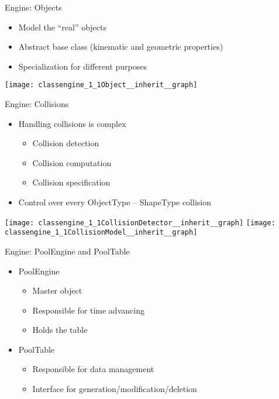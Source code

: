 \documentclass{beamer}
\begin{document}
\begin{frame}{Engine: Objects}
	\begin{itemize}
		\item Model the ``real'' objects
		\item Abstract base class (kinematic and geometric properties)
		\item Specialization for different purposes
	\end{itemize}
	
	\begin{center}
		\texttt{[image: classengine\_1\_1Object\_\_inherit\_\_graph]}
	\end{center}
\end{frame}

\begin{frame}{Engine: Collisions}
	\begin{itemize}
		\item Handling collisions is complex
		\begin{itemize}
			\item Collision detection
			\item Collision computation
			\item Collision specification
		\end{itemize}
		
		\vspace*{1em}
		\item Control over every ObjectType -- ShapeType collision
	\end{itemize}
	\begin{center}
		\texttt{[image: classengine\_1\_1CollisionDetector\_\_inherit\_\_graph]}
		\texttt{[image: classengine\_1\_1CollisionModel\_\_inherit\_\_graph]}
	\end{center}
\end{frame}

\begin{frame}{Engine: PoolEngine and PoolTable}
	\begin{itemize}
		\item PoolEngine
		\begin{itemize}
			\item Master object
			\item Responsible for time advancing
			\item Holds the table
		\end{itemize}
		
		\vspace*{1em}
		\item PoolTable
		\begin{itemize}
			\item Responsible for data management
			\item Interface for generation/modification/deletion
		\end{itemize}
	\end{itemize}
\end{frame}
\end{document}
